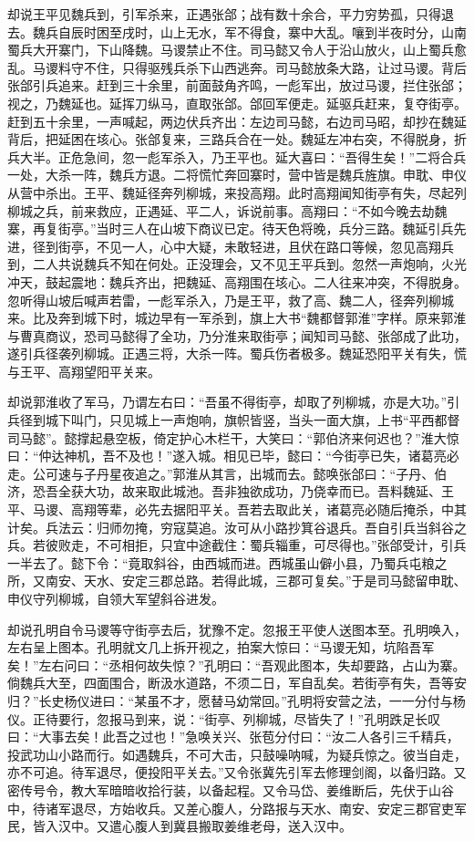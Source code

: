 却说王平见魏兵到，引军杀来，正遇张郃；战有数十余合，平力穷势孤，只得退去。魏兵自辰时困至戌时，山上无水，军不得食，寨中大乱。嚷到半夜时分，山南蜀兵大开寨门，下山降魏。马谡禁止不住。司马懿又令人于沿山放火，山上蜀兵愈乱。马谡料守不住，只得驱残兵杀下山西逃奔。司马懿放条大路，让过马谡。背后张郃引兵追来。赶到三十余里，前面鼓角齐鸣，一彪军出，放过马谡，拦住张郃；视之，乃魏延也。延挥刀纵马，直取张郃。郃回军便走。延驱兵赶来，复夺街亭。赶到五十余里，一声喊起，两边伏兵齐出：左边司马懿，右边司马昭，却抄在魏延背后，把延困在垓心。张郃复来，三路兵合在一处。魏延左冲右突，不得脱身，折兵大半。正危急间，忽一彪军杀入，乃王平也。延大喜曰：“吾得生矣！”二将合兵一处，大杀一阵，魏兵方退。二将慌忙奔回寨时，营中皆是魏兵旌旗。申耽、申仪从营中杀出。王平、魏延径奔列柳城，来投高翔。此时高翔闻知街亭有失，尽起列柳城之兵，前来救应，正遇延、平二人，诉说前事。高翔曰：“不如今晚去劫魏寨，再复街亭。”当时三人在山坡下商议已定。待天色将晚，兵分三路。魏延引兵先进，径到街亭，不见一人，心中大疑，未敢轻进，且伏在路口等候，忽见高翔兵到，二人共说魏兵不知在何处。正没理会，又不见王平兵到。忽然一声炮响，火光冲天，鼓起震地：魏兵齐出，把魏延、高翔围在垓心。二人往来冲突，不得脱身。忽听得山坡后喊声若雷，一彪军杀入，乃是王平，救了高、魏二人，径奔列柳城来。比及奔到城下时，城边早有一军杀到，旗上大书“魏都督郭淮”字样。原来郭淮与曹真商议，恐司马懿得了全功，乃分淮来取街亭；闻知司马懿、张郃成了此功，遂引兵径袭列柳城。正遇三将，大杀一阵。蜀兵伤者极多。魏延恐阳平关有失，慌与王平、高翔望阳平关来。

却说郭淮收了军马，乃谓左右曰：“吾虽不得街亭，却取了列柳城，亦是大功。”引兵径到城下叫门，只见城上一声炮响，旗帜皆竖，当头一面大旗，上书“平西都督司马懿”。懿撑起悬空板，倚定护心木栏干，大笑曰：“郭伯济来何迟也？”淮大惊曰：“仲达神机，吾不及也！”遂入城。相见已毕，懿曰：“今街亭已失，诸葛亮必走。公可速与子丹星夜追之。”郭淮从其言，出城而去。懿唤张郃曰：“子丹、伯济，恐吾全获大功，故来取此城池。吾非独欲成功，乃侥幸而已。吾料魏延、王平、马谡、高翔等辈，必先去据阳平关。吾若去取此关，诸葛亮必随后掩杀，中其计矣。兵法云：归师勿掩，穷寇莫追。汝可从小路抄箕谷退兵。吾自引兵当斜谷之兵。若彼败走，不可相拒，只宜中途截住：蜀兵辎重，可尽得也。”张郃受计，引兵一半去了。懿下令：“竟取斜谷，由西城而进。西城虽山僻小县，乃蜀兵屯粮之所，又南安、天水、安定三郡总路。若得此城，三郡可复矣。”于是司马懿留申耽、申仪守列柳城，自领大军望斜谷进发。

却说孔明自令马谡等守街亭去后，犹豫不定。忽报王平使人送图本至。孔明唤入，左右呈上图本。孔明就文几上拆开视之，拍案大惊曰：“马谡无知，坑陷吾军矣！”左右问曰：“丞相何故失惊？”孔明曰：“吾观此图本，失却要路，占山为寨。倘魏兵大至，四面围合，断汲水道路，不须二日，军自乱矣。若街亭有失，吾等安归？”长史杨仪进曰：“某虽不才，愿替马幼常回。”孔明将安营之法，一一分付与杨仪。正待要行，忽报马到来，说：“街亭、列柳城，尽皆失了！”孔明跌足长叹曰：“大事去矣！此吾之过也！”急唤关兴、张苞分付曰：“汝二人各引三千精兵，投武功山小路而行。如遇魏兵，不可大击，只鼓噪呐喊，为疑兵惊之。彼当自走，亦不可追。待军退尽，便投阳平关去。”又令张冀先引军去修理剑阁，以备归路。又密传号令，教大军暗暗收拾行装，以备起程。又令马岱、姜维断后，先伏于山谷中，待诸军退尽，方始收兵。又差心腹人，分路报与天水、南安、安定三郡官吏军民，皆入汉中。又遣心腹人到冀县搬取姜维老母，送入汉中。

